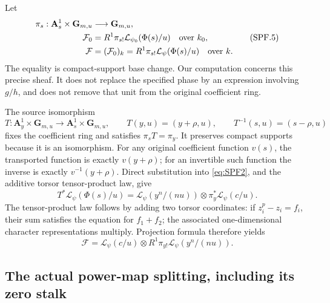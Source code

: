 Let
\[
 \begin{split}
 \pi_s:\mathbf A^1_s\times\mathbf G_{m,u}&\longrightarrow
                  \mathbf G_{m,u},\\
 \mathcal F_0&=R^1\pi_{s!}\mathcal L_{\psi_0}(\Phi(s)/u)
                    \quad\hbox{over }k_0,\\
 \mathcal F&=(\mathcal F_0)_k
       =R^1\pi_{s!}\mathcal L_\psi(\Phi(s)/u)
                    \quad\hbox{over }k .
 \end{split}
 \tag{SPF.5}\label{eq:SPF5}
\]
The equality is compact-support base change. Our computation concerns
this precise sheaf. It does not replace the specified phase by
an expression involving \(g/h\), and does not remove that unit from
the original coefficient ring.

The source isomorphism
\[
 T:\mathbf A^1_y\times\mathbf G_{m,u}
       \longrightarrow\mathbf A^1_s\times\mathbf G_{m,u},
 \qquad T(y,u)=(y+\rho,u),\qquad
 T^{-1}(s,u)=(s-\rho,u)
 \tag{SPF.6}\label{eq:SPF6}
\]
fixes the coefficient ring and satisfies \(\pi_sT=\pi_y\).
It preserves compact supports because it is an isomorphism.
For any original coefficient function \(v(s)\), the transported
function is exactly \(v(y+\rho)\); for an invertible such function
the inverse is exactly \(v^{-1}(y+\rho)\).
Direct substitution into \eqref{eq:SPF2}, and the additive torsor
tensor-product law, give
\[
 T^*\mathcal L_\psi(\Phi(s)/u)
  =\mathcal L_\psi(y^n/(nu))
      \otimes\pi_y^*\mathcal L_\psi(c/u).
 \tag{SPF.7}\label{eq:SPF7}
\]
The tensor-product law follows by adding two torsor coordinates:
if \(z_i^p-z_i=f_i\), their sum satisfies the equation for \(f_1+f_2\);
the associated one-dimensional character representations multiply.
Projection formula therefore yields
\[
 \mathcal F=
 \mathcal L_\psi(c/u)\otimes
 R^1\pi_{y!}\mathcal L_\psi(y^n/(nu)).
 \tag{SPF.8}\label{eq:SPF8}
\]

\subsection{The actual power-map splitting, including its zero stalk}

